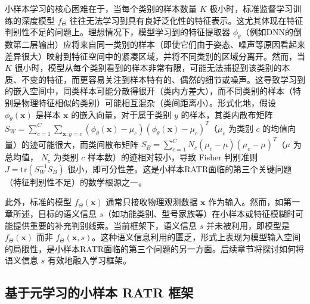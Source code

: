 小样本学习的核心困难在于，当每个类别的样本数量 $K$ 极小时，标准监督学习训练的深度模型 $f_\Theta$ 往往无法学习到具有良好泛化性的特征表示。这尤其体现在特征判别性不足的问题上。理想情况下，模型学习到的特征提取器 $\phi_\theta$（例如DNN的倒数第二层输出）应将来自同一类别的样本（即使它们由于姿态、噪声等原因看起来差异很大）映射到特征空间中的紧凑区域，并将不同类别的区域分离开。然而，当 $K$ 很小时，模型从每个类别看到的样本非常有限，可能无法捕捉到该类别的本质、不变的特征，而更容易关注到样本特有的、偶然的细节或噪声。这导致学习到的嵌入空间中，同类样本可能分散得很开（类内方差大），而不同类别的样本（特别是物理特征相似的类别）可能相互混杂（类间距离小）。形式化地，假设 $\phi_\theta(\mathbf{x})$ 是样本 $\mathbf{x}$ 的嵌入向量，对于属于类别 $y$ 的样本，其类内散布矩阵 $S_W = \sum_{c=1}^C \sum_{\mathbf{x}: y=c} (\phi_\theta(\mathbf{x}) - \mu_c)(\phi_\theta(\mathbf{x}) - \mu_c)^T$（$\mu_c$ 为类别 $c$ 的均值向量）的迹可能很大，而类间散布矩阵 $S_B = \sum_{c=1}^C N_c (\mu_c - \mu)(\mu_c - \mu)^T$（$\mu$ 为总均值， $N_c$ 为类别 $c$ 样本数）的迹相对较小，导致 Fisher 判别准则 $J = \text{tr}(S_W^{-1} S_B)$ 很小，即可分性差。这是小样本RATR面临的第三个关键问题（特征判别性不足）的数学根源之一。

此外，标准的模型 $f_\Theta(\mathbf{x})$ 通常只接收物理观测数据 $\mathbf{x}$ 作为输入。然而，如第一章所述，目标的语义信息 $s$（如功能类别、型号家族等）在小样本或特征模糊时可能提供重要的补充判别线索。当前框架下，语义信息 $s$ 并未被利用，即模型是 $f_\Theta(\mathbf{x})$ 而非 $f_\Theta(\mathbf{x}, s)$。这种语义信息利用的匮乏，形式上表现为模型输入空间的局限性，是小样本RATR面临的第三个问题的另一方面。后续章节将探讨如何将语义信息 $s$ 有效地融入学习框架。

\subsection{基于元学习的小样本 RATR 框架}
\label{subsec:meta_learning_framework}

